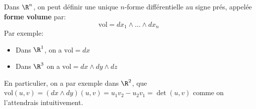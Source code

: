\documentclass{report}
\begin{document}
   \subsection*{}
   Dans \(\R^n\), on peut définir une unique \(n\)-forme différentielle au signe prés, appelée \textbf{forme volume}  par:
   \[
      \text{vol} = dx_1 \wedge \ldots \wedge dx_n
   \]
   Par exemple:
   \begin{itemize}
      \item Dans \(\R^1\), on a \(\text{vol} = dx\)
      \item Dans \(\R^3\) on a \(\text{vol} = dx \wedge dy \wedge dz\)
   \end{itemize}
   En particulier, on a par exemple dans \(\R^2\), que \(\text{vol}(u, v) = (dx \wedge dy)(u, v) = u_1v_2 - u_2v_1 = \det(u, v)\) comme on l'attendrais intuitivement.
\end{document}
